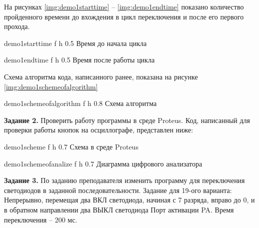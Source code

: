 \documentclass{bmstu}
\begin{document}
На рисунках \ref{img:demo1starttime} -- \ref{img:demo1endtime} показано количество пройденного времени до
вхождения в цикл переключения и после его первого прохода.


    {demo1starttime} %
    {f} %
    {h} %
    {0.5\textwidth} %
    {Время до начала цикла} %

    {demo1endtime} %
    {f} %
    {h} %
    {0.5\textwidth} %
    {Время после работы цикла} %

Схема алгоритма кода, написанного ранее, показана на рисунке \ref{img:demo1schemeofalgorithm}

    {demo1schemeofalgorithm} %
    {f} %
    {h} %
    {0.8\textwidth} %
    {Схема алгоритма} %
    
\newpage

\textbf{Задание 2.}
\newline
Проверить работу программы в среде Proteus.
Код, написанный для проверки работы кнопок на осциллографе,
представлен ниже:

    {demo1scheme} %
    {f} %
    {h} %
    {0.7\textwidth} %
    {Схема в среде Proteus} %

    {demo1schemeofanalize} %
    {f} %
    {h} %
    {0.7\textwidth} %
    {Диаграмма цифрового анализатора} %

\newpage
\textbf{Задание 3.}
\newline
По заданию преподавателя изменить программу для переключения
светодиодов в заданной последовательности.
Задание для 19-ого варианта:
Непрерывно, перемещая два ВКЛ светодиода,
начиная с 7 разряда, вправо до 0,
и в обратном направлении два ВЫКЛ светодиода
Порт активации PA.
Время переключения – 200 мс.
\end{document}
